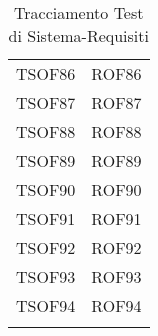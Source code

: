 \documentclass[../PianoDiQualifica_v3.0.0.tex]{subfiles}
\begin{document}
\begin{longtable}[c] { >{\centering\arraybackslash}p{3cm} >{\centering\arraybackslash}p{3cm}}
			\addlinespace[0.3em]
			\midrule
			\addlinespace[0.3em]
			TSOF86 & ROF86 \\
			\addlinespace[0.3em]
			\midrule
			\addlinespace[0.3em]
			TSOF87 & ROF87 \\
			\addlinespace[0.3em]
			\midrule
			\addlinespace[0.3em]
			TSOF88 & ROF88 \\
			\addlinespace[0.3em]
			\midrule
			\addlinespace[0.3em]
			TSOF89 & ROF89\\
			\addlinespace[0.3em]
			\midrule
			\addlinespace[0.3em]
			TSOF90 & ROF90 \\
			\addlinespace[0.3em]
			\midrule
			\addlinespace[0.3em]
			TSOF91 & ROF91 \\
			\addlinespace[0.3em]
			\midrule
			\addlinespace[0.3em]
			TSOF92 & ROF92 \\
			\addlinespace[0.3em]
			\midrule
			\addlinespace[0.3em]
			TSOF93 & ROF93 \\
			\addlinespace[0.3em]
			\midrule
			\addlinespace[0.3em]
			TSOF94 & ROF94 \\
			\bottomrule
			\caption{Tracciamento Test di Sistema-Requisiti}
	\end{longtable}
\end{document}
